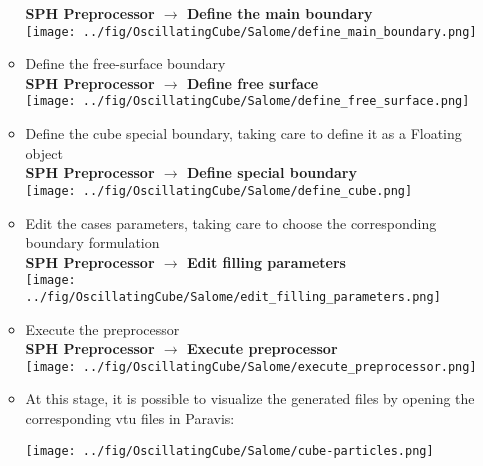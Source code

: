 \documentclass{../GPUSPHtemplate}
\begin{document}
\begin{enumerate}
\begin{itemize}
    \textbf{SPH Preprocessor $\to$ Define the main boundary}\smallskip\\
    \texttt{[image: ../fig/OscillatingCube/Salome/define\_main\_boundary.png]}
  \item Define the free-surface boundary\\
    \textbf{SPH Preprocessor $\to$ Define free surface}\smallskip\\
    \texttt{[image: ../fig/OscillatingCube/Salome/define\_free\_surface.png]}
  \item Define the cube special boundary, taking care to define it as a Floating object\\
    \textbf{SPH Preprocessor $\to$ Define special boundary}\smallskip\\
    \texttt{[image: ../fig/OscillatingCube/Salome/define\_cube.png]}
  \item Edit the cases parameters, taking care to choose the corresponding boundary formulation\\
    \textbf{SPH Preprocessor $\to$ Edit filling parameters}\\
    \texttt{[image: ../fig/OscillatingCube/Salome/edit\_filling\_parameters.png]}
  \item Execute the preprocessor\\
    \textbf{SPH Preprocessor $\to$ Execute preprocessor}\smallskip\\
    \texttt{[image: ../fig/OscillatingCube/Salome/execute\_preprocessor.png]}
  \item At this stage, it is possible to visualize the generated files by opening the corresponding vtu files in Paravis:\\
    \begin{center}\texttt{[image: ../fig/OscillatingCube/Salome/cube-particles.png]}\end{center}
    

\end{itemize}
\end{enumerate}
\end{document}
